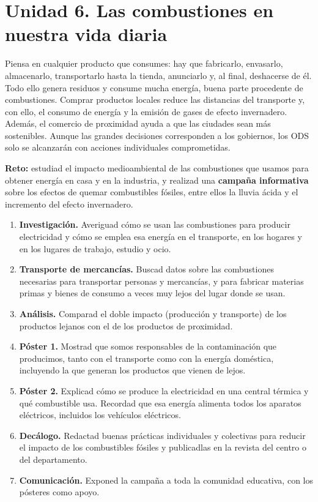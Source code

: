 \section{Unidad 6. Las combustiones en nuestra vida diaria}

Piensa en cualquier producto que consumes: hay que fabricarlo, envasarlo, almacenarlo, transportarlo hasta la tienda, anunciarlo y, al final, deshacerse de él. Todo ello genera residuos y consume mucha energía, buena parte procedente de combustiones. Comprar productos locales reduce las distancias del transporte y, con ello, el consumo de energía y la emisión de gases de efecto invernadero. Además, el comercio de proximidad ayuda a que las ciudades sean más sostenibles. Aunque las grandes decisiones corresponden a los gobiernos, los ODS solo se alcanzarán con acciones individuales comprometidas.

\begin{marker}
    \textbf{Reto:} estudiad el impacto medioambiental de las combustiones que usamos para obtener energía en casa y en la industria, y realizad una \textbf{campaña informativa} sobre los efectos de quemar combustibles fósiles, entre ellos la lluvia ácida y el incremento del efecto invernadero.
\end{marker}

\begin{enumerate}[label=\numberballred]
    \item \textbf{Investigación.} Averiguad cómo se usan las combustiones para producir electricidad y cómo se emplea esa energía en el transporte, en los hogares y en los lugares de trabajo, estudio y ocio.
    \item \textbf{Transporte de mercancías.} Buscad datos sobre las combustiones necesarias para transportar personas y mercancías, y para fabricar materias primas y bienes de consumo a veces muy lejos del lugar donde se usan.
    \item \textbf{Análisis.} Comparad el doble impacto (producción y transporte) de los productos lejanos con el de los productos de proximidad.
    \item \textbf{Póster 1.} Mostrad que somos responsables de la contaminación que producimos, tanto con el transporte como con la energía doméstica, incluyendo la que generan los productos que vienen de lejos.
    \item \textbf{Póster 2.} Explicad cómo se produce la electricidad en una central térmica y qué combustible usa. Recordad que esa energía alimenta todos los aparatos eléctricos, incluidos los vehículos eléctricos.
    \item \textbf{Decálogo.} Redactad buenas prácticas individuales y colectivas para reducir el impacto de los combustibles fósiles y publicadlas en la revista del centro o del departamento.
    \item \textbf{Comunicación.} Exponed la campaña a toda la comunidad educativa, con los pósteres como apoyo.
\end{enumerate}

